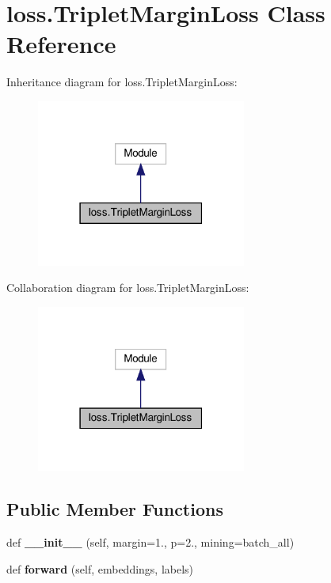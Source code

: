 \hypertarget{classloss_1_1TripletMarginLoss}{}\section{loss.\+Triplet\+Margin\+Loss Class Reference}
\label{classloss_1_1TripletMarginLoss}


Inheritance diagram for loss.\+Triplet\+Margin\+Loss\+:
\nopagebreak
\begin{figure}[H]
\begin{center}
\leavevmode
\includegraphics[width=195pt]{classloss_1_1TripletMarginLoss__inherit__graph}
\end{center}
\end{figure}


Collaboration diagram for loss.\+Triplet\+Margin\+Loss\+:
\nopagebreak
\begin{figure}[H]
\begin{center}
\leavevmode
\includegraphics[width=195pt]{classloss_1_1TripletMarginLoss__coll__graph}
\end{center}
\end{figure}
\subsection*{Public Member Functions}
\begin{DoxyCompactItemize}
\item 
\mbox{\label{classloss_1_1TripletMarginLoss_a164854968295d3e8177d5fceab1ccdc9}} 
def {\bfseries \+\_\+\+\_\+init\+\_\+\+\_\+} (self, margin=1., p=2., mining=\textquotesingle{}batch\+\_\+all\textquotesingle{})
\item 
\mbox{\label{classloss_1_1TripletMarginLoss_a0c94345e8ca8cd739c81c1f694af570d}} 
def {\bfseries forward} (self, embeddings, labels)
\end{DoxyCompactItemize}
